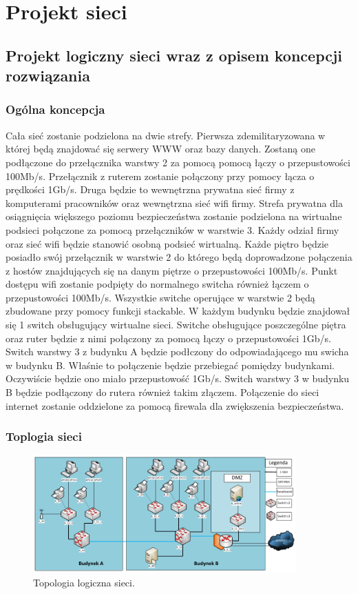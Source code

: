 \documentclass{report}
\begin{document}
\chapter{Projekt sieci}
\section{Projekt logiczny sieci wraz z opisem koncepcji rozwiązania}
\subsection{Ogólna koncepcja}

Cała sieć zostanie podzielona na dwie strefy. Pierwsza zdemilitaryzowana w której będą znajdować się serwery WWW oraz bazy danych. 
Zostaną one podłączone do przełącznika warstwy 2 za pomocą pomocą łączy o przepustowości 100Mb/s. Przełącznik z ruterem zostanie połączony 
przy pomocy łącza o prędkości 1Gb/s. Druga będzie to wewnętrzna prywatna sieć firmy z komputerami pracowników oraz wewnętrzna sieć wifi firmy. 
Strefa prywatna dla osiągnięcia większego poziomu bezpieczeństwa zostanie podzielona na wirtualne podsieci połączone za pomocą przełączników w warstwie 3. Każdy odział firmy
oraz sieć wifi będzie stanowić osobną podsieć wirtualną. Każde piętro będzie posiadło swój przełącznik w warstwie 2 do którego będą
doprowadzone połączenia z hostów znajdujących się na danym piętrze o przepustowości 100Mb/s.
Punkt dostępu wifi zostanie  podpięty do normalnego switcha również łączem o przepustowości 100Mb/s. Wszystkie switche operujące
w warstwie 2 będą zbudowane przy pomocy funkcji stackable. W każdym budynku będzie znajdował 
się 1 switch obsługujący wirtualne sieci. Switche obsługujące poszczególne piętra oraz ruter będzie z nimi połączony za pomocą łączy o przepustowości 1Gb/s.
Switch warstwy 3 z budynku A będzie podłczony do odpowiadającego mu swicha w budynku B. Właśnie to połączenie będzie przebiegać pomiędzy budynkami. Oczywiście
będzie ono miało przepustowość 1Gb/s. Switch warstwy 3 w budynku B będzie podłączony do rutera również takim złączem. 
Połączenie do sieci internet zostanie oddzielone za pomocą firewala dla zwiększenia bezpieczeństwa.

\subsection{Toplogia sieci}
\begin{figure}[H]
  \centering
      \includegraphics[width=0.9\textwidth]{./obrazki/topo_log.png}
  \caption{Topologia logiczna sieci.}
\end{figure}
\end{document}
